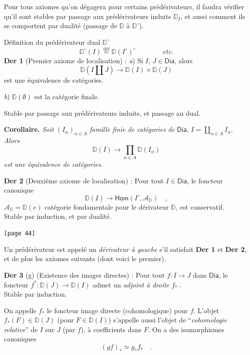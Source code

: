 \documentclass[11pt]{article}
\newcommand{\printedpage}[1]{\marginpar{\footnotesize p.~#1}}
\newcommand{\msp}[1]{\marginpar{\footnotesize [#1]}}
\newcommand{\Dia}{\mathsf{Dia}}
\newcommand{\DD}{\mathbb{D}}
\newcommand{\D}{\mathbb{D}}
\newcommand{\sDia}{\mathsf{Dia}}
\begin{document}
Pour tous axiomes qu'on dégagera pour certains prédérivateurs, il faudra vérifier qu'il sont stables par passage aux prédérivateurs induits $\DD_I$, et aussi comment ils se comportent par dualité (passage de $\DD$ à $\DD^\circ$). %

Définition du prédérivateur dual $\DD^\circ$
\[ \DD^\circ(I) \overset{\text{déf}}{=} \DD(I^\circ)^\circ \qquad\qquad \textit{etc.} \]
\textbf{Der 1} (Premier axiome de localisation) : \textit{a}) Si $I$, $J \in \sDia$, alors
\[ \DD(I \amalg J) \longrightarrow \DD(I) \times \DD(J) \]
est une équivalence de catégories.

\textit{b}) $\DD(\emptyset)$ est la catégorie finale.

Stable par passage aux prédérivateurs induits, et passage au dual.

\textbf{Corollaire.} \textit{Soit} $(I_\alpha)_{\alpha \in A}$ \textit{famille finie de catégories de} $\sDia$, $I = \coprod\limits_{\alpha \in A} I_\alpha$. \textit{Alors}
\[ \DD(I) \longrightarrow \prod_{\alpha \in A} \DD(I_\alpha) \]
\textit{est une équivalence de catégories.}

\printedpage{24}

\noindent\textbf{Der 2} (Deuxième axiome de localisation) : Pour tout $I \in \Dia$, le foncteur canonique
\[ \D(I) \longrightarrow \underline{\mathsf{Hom}}(I^{\circ}, \mathcal{A}_{\D}) \quad , \]
$\mathcal{A}_{\D} = \D(e)$ catégorie fondamentale pour le dérivateur $\D$, est conservatif.\\
Stable par induction, et par dualité.

\noindent\msp{page 44}\texttt{[page 44]}

\noindent Un prédérivateur est appelé un \textit{dérivateur à gauche} s'il satisfait \textbf{Der 1} et \textbf{Der 2}, et de plus les axiomes suivants (dont voici le premier).

\noindent\textbf{Der 3} (g) (Existence des images directes) : Pour tout $f : I \to J$ dans $\Dia$, le foncteur $f^{*} : \D(J) \to \D(I)$ admet un \textit{adjoint à droite} $f_{*}$\,.\\
Stable par induction.

On appelle $f_{*}$ le foncteur image directe (cohomologique) pour $f$. L'objet $f_{*}(F) \in \D(J)$ (pour $F \in \D(I)$) s'appelle aussi l'objet de “\textit{cohomologie relative}” de $I$ sur $J$ (par $f$), à coefficients dans $F$. On a des isomorphismes canoniques
\[ (gf)_{*} \simeq g_{*} f_{*} \quad . \]
\end{document}
